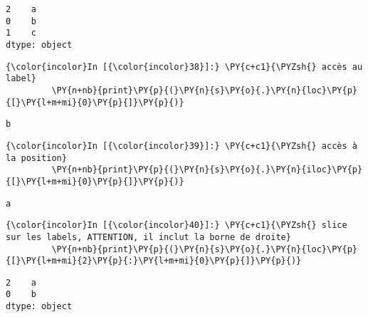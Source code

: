     \begin{Verbatim}[commandchars=\\\{\},frame=single,framerule=0.3mm,rulecolor=\color{cellframecolor}]
2    a
0    b
1    c
dtype: object
\end{Verbatim}

    \begin{Verbatim}[commandchars=\\\{\},frame=single,framerule=0.3mm,rulecolor=\color{cellframecolor}]
{\color{incolor}In [{\color{incolor}38}]:} \PY{c+c1}{\PYZsh{} accès au label}
         \PY{n+nb}{print}\PY{p}{(}\PY{n}{s}\PY{o}{.}\PY{n}{loc}\PY{p}{[}\PY{l+m+mi}{0}\PY{p}{]}\PY{p}{)}
\end{Verbatim}


    \begin{Verbatim}[commandchars=\\\{\},frame=single,framerule=0.3mm,rulecolor=\color{cellframecolor}]
b
\end{Verbatim}

    \begin{Verbatim}[commandchars=\\\{\},frame=single,framerule=0.3mm,rulecolor=\color{cellframecolor}]
{\color{incolor}In [{\color{incolor}39}]:} \PY{c+c1}{\PYZsh{} accès à la position}
         \PY{n+nb}{print}\PY{p}{(}\PY{n}{s}\PY{o}{.}\PY{n}{iloc}\PY{p}{[}\PY{l+m+mi}{0}\PY{p}{]}\PY{p}{)}
\end{Verbatim}


    \begin{Verbatim}[commandchars=\\\{\},frame=single,framerule=0.3mm,rulecolor=\color{cellframecolor}]
a
\end{Verbatim}

    \begin{Verbatim}[commandchars=\\\{\},frame=single,framerule=0.3mm,rulecolor=\color{cellframecolor}]
{\color{incolor}In [{\color{incolor}40}]:} \PY{c+c1}{\PYZsh{} slice sur les labels, ATTENTION, il inclut la borne de droite}
         \PY{n+nb}{print}\PY{p}{(}\PY{n}{s}\PY{o}{.}\PY{n}{loc}\PY{p}{[}\PY{l+m+mi}{2}\PY{p}{:}\PY{l+m+mi}{0}\PY{p}{]}\PY{p}{)}
\end{Verbatim}


    \begin{Verbatim}[commandchars=\\\{\},frame=single,framerule=0.3mm,rulecolor=\color{cellframecolor}]
2    a
0    b
dtype: object
\end{Verbatim}

